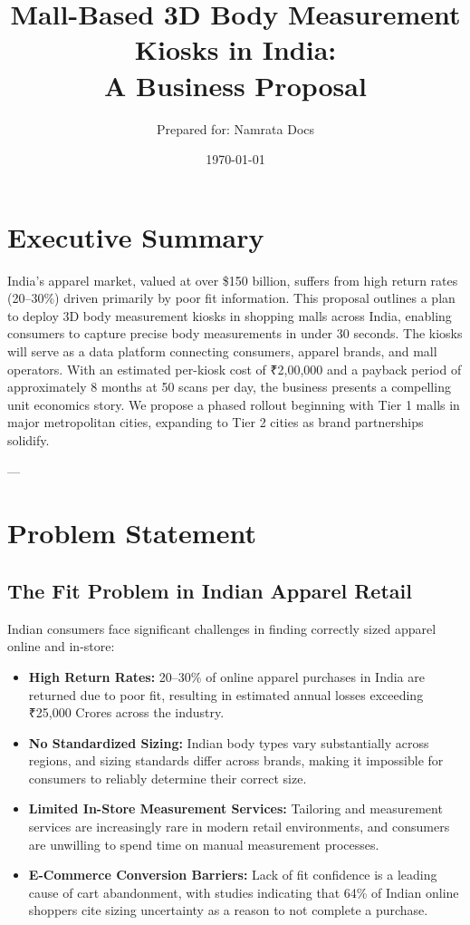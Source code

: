 \documentclass[12pt,a4paper]{article}
\title{Mall-Based 3D Body Measurement Kiosks in India:\\ A Business Proposal}
\author{Prepared for: Namrata Docs}
\date{\today}
\begin{document}
\maketitle

\section*{Executive Summary}

India's apparel market, valued at over \$150 billion, suffers from high return rates (20--30\%) driven primarily by poor fit information. This proposal outlines a plan to deploy 3D body measurement kiosks in shopping malls across India, enabling consumers to capture precise body measurements in under 30 seconds. The kiosks will serve as a data platform connecting consumers, apparel brands, and mall operators. With an estimated per-kiosk cost of ₹2,00,000 and a payback period of approximately 8 months at 50 scans per day, the business presents a compelling unit economics story. We propose a phased rollout beginning with Tier 1 malls in major metropolitan cities, expanding to Tier 2 cities as brand partnerships solidify.

---

\section{Problem Statement}

\subsection{The Fit Problem in Indian Apparel Retail}

Indian consumers face significant challenges in finding correctly sized apparel online and in-store:

\begin{itemize}
    \item \textbf{High Return Rates:} 20--30\% of online apparel purchases in India are returned due to poor fit, resulting in estimated annual losses exceeding ₹25,000 Crores across the industry.
    \item \textbf{No Standardized Sizing:} Indian body types vary substantially across regions, and sizing standards differ across brands, making it impossible for consumers to reliably determine their correct size.
    \item \textbf{Limited In-Store Measurement Services:} Tailoring and measurement services are increasingly rare in modern retail environments, and consumers are unwilling to spend time on manual measurement processes.
    \item \textbf{E-Commerce Conversion Barriers:} Lack of fit confidence is a leading cause of cart abandonment, with studies indicating that 64\% of Indian online shoppers cite sizing uncertainty as a reason to not complete a purchase.
\end{itemize}
\end{document}

